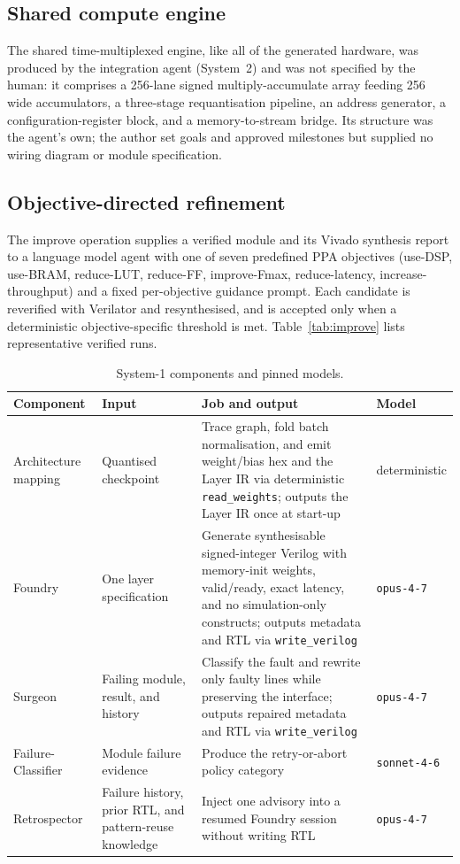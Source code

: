 \documentclass[acmtog,authorversion]{acmart}
\begin{document}
\subsection{Shared compute engine}\label{app:engine}

The shared time-multiplexed engine, like all of the generated hardware, was produced by the integration agent (System~2) and was not specified by the human: it comprises a 256-lane signed multiply-accumulate array feeding 256 wide accumulators, a three-stage requantisation pipeline, an address generator, a configuration-register block, and a memory-to-stream bridge. Its structure was the agent's own; the author set goals and approved milestones but supplied no wiring diagram or module specification.

\subsection{Objective-directed refinement}\label{app:improve}

The improve operation supplies a verified module and its Vivado synthesis report to a language model agent with one of seven predefined PPA objectives (use-DSP, use-BRAM, reduce-LUT, reduce-FF, improve-Fmax, reduce-latency, increase-throughput) and a fixed per-objective guidance prompt. Each candidate is reverified with Verilator and resynthesised, and is accepted only when a deterministic objective-specific threshold is met. Table~\ref{tab:improve} lists representative verified runs.

\begin{table}[!htbp]
\centering
\caption{System-1 components and pinned models.}
\label{tab:agents}
\setlength{\tabcolsep}{4pt}
\begin{tabular}{@{}>{\raggedright\arraybackslash}p{}p{}p{}p{}@{}}
\toprule
Component & Input & Job and output & Model \\
\midrule
Architecture mapping & Quantised checkpoint & Trace graph, fold batch normalisation, and emit weight/bias hex and the Layer IR via deterministic \texttt{read\_weights}; outputs the Layer IR once at start-up & deterministic \\
Foundry & One layer specification & Generate synthesisable signed-integer Verilog with memory-init weights, valid/ready, exact latency, and no simulation-only constructs; outputs metadata and RTL via \texttt{write\_verilog} & \texttt{opus-4-7} \\
Surgeon & Failing module, result, and history & Classify the fault and rewrite only faulty lines while preserving the interface; outputs repaired metadata and RTL via \texttt{write\_verilog} & \texttt{opus-4-7} \\
Failure-Classifier & Module failure evidence & Produce the retry-or-abort policy category & \texttt{sonnet-4-6} \\
Retrospector & Failure history, prior RTL, and pattern-reuse knowledge & Inject one advisory into a resumed Foundry session without writing RTL & \texttt{opus-4-7} \\
\bottomrule
\end{tabular}
\end{table}
\end{document}
